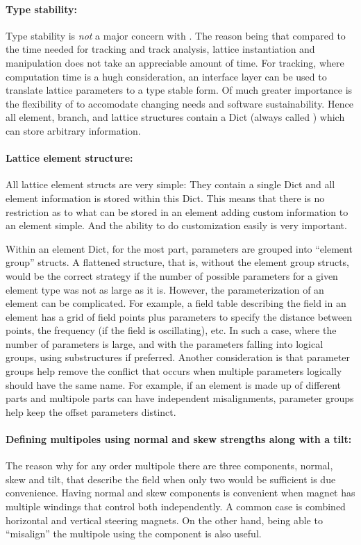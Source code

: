 \paragraph{Type stability:}
Type stability is {\em not} a major concern with \accellat. The reason being that compared to
the time needed for tracking and track analysis, lattice instantiation
and manipulation does not take an appreciable amount of time. For tracking, where computation time
is a hugh consideration, an interface layer can be
used to translate lattice parameters to a type stable form. Of much greater importance is the
flexibility of \accellat to accomodate changing needs and software sustainability. 
Hence all element, branch, and lattice structures contain a Dict (always called ) which
can store arbitrary information.

\paragraph{Lattice element structure:}
All lattice element structs are very simple: They contain a single Dict and all element information
is stored within this Dict. This means that there is no restriction as to what can be stored
in an element adding custom information to an element simple. 
And the ability to do customization easily is very important. 

Within an element Dict, for the most part, parameters are grouped into ``element group'' structs. 
A flattened structure, that is, without the element group structs, would be the correct strategy
if the number of possible parameters for a given element type was not as large as it is. 
However, the parameterization of an element can be complicated. 
For example, a field table describing the field in an element has a grid of field points plus 
parameters to specify the distance between points, the frequency (if the field is oscillating), etc.
In such a case, where the number of parameters is large, and with the parameters falling into 
logical groups, using substructures if preferred. Another consideration is that parameter groups
help remove the conflict that occurs when multiple parameters logically should have the same name.
For example, if an element is made up of different parts and multipole parts can have independent
misalignments, parameter groups help keep the offset parameters distinct. 

\paragraph{Defining multipoles using normal and skew strengths along with a tilt:}
The reason why for any order multipole there are three components, 
normal, skew and tilt, that describe the field when only two would be sufficient is due convenience.
Having normal and skew components is convenient when magnet has multiple windings that control
both independently. A common case is combined horizontal and vertical steering magnets. On the
other hand, being able to ``misalign'' the multipole using the  component is also
useful.
